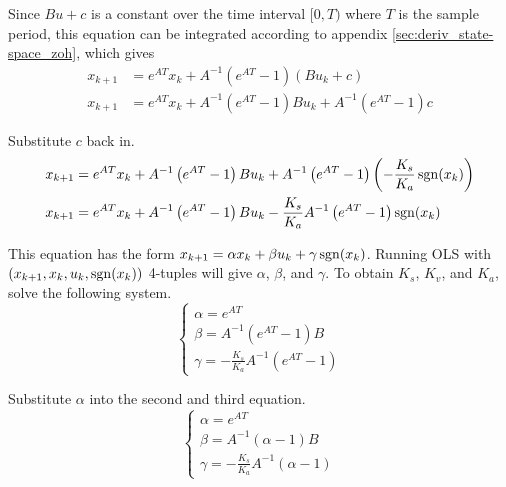 Since $Bu + c$ is a constant over the time interval $[0, T)$ where $T$ is the
sample period, this equation can be integrated according to appendix
\ref{sec:deriv_state-space_zoh}, which gives
\begin{align*}
  x_{k+1} &= e^{AT} x_k + A^{-1} (e^{AT} - 1) (Bu_k + c) \\
  x_{k+1} &= e^{AT} x_k + A^{-1} (e^{AT} - 1)Bu_k + A^{-1} (e^{AT} - 1)c
\end{align*}

Substitute $c$ back in.
\begin{align*}
  x_{k+1} &= e^{AT} x_k + A^{-1} \left(e^{AT} - 1\right) B u_k
    + A^{-1} \left(e^{AT} - 1\right) \left(-\frac{K_s}{K_a} \operatorname{sgn}(x_k)\right) \\
  x_{k+1} &= e^{AT} x_k +  A^{-1} \left(e^{AT} - 1\right) B u_k
    - \frac{K_s}{K_a} A^{-1} \left(e^{AT} - 1\right) \operatorname{sgn}(x_k)
\end{align*}

This equation has the form
$x_{k+1} = \alpha x_k + \beta u_k + \gamma \operatorname{sgn}(x_k)$. Running OLS with
$(x_{k+1}, x_k, u_k, \operatorname{sgn}(x_k))$ 4-tuples will give $\alpha$, $\beta$, and
$\gamma$. To obtain $K_s$, $K_v$, and $K_a$, solve the following system.
\begin{equation*}
  \begin{cases}
    \alpha = e^{AT} \\
    \beta = A^{-1} \left(e^{AT} - 1\right)B \\
    \gamma = -\frac{K_s}{K_a} A^{-1} \left(e^{AT} - 1\right)
  \end{cases}
\end{equation*}

Substitute $\alpha$ into the second and third equation.
\begin{equation}
  \begin{cases}
    \alpha = e^{AT} \\
    \beta = A^{-1} (\alpha - 1) B \\
    \gamma = -\frac{K_s}{K_a} A^{-1} (\alpha - 1)
  \end{cases} \label{eq:ols_system}
\end{equation}

